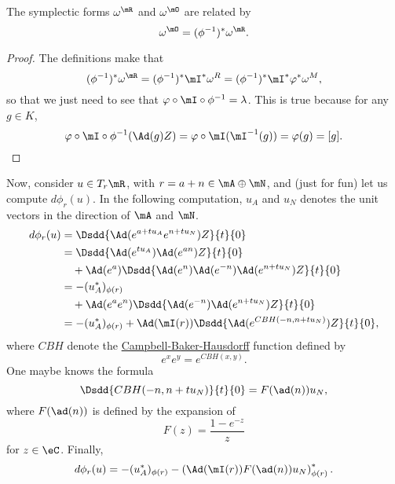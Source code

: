 \begin{lemma}\label{lem:om_O_om_R}
The symplectic forms $\omega^{\mR}$ and $\omega^{\mO}$ are related by
\begin{equation}
\omega^{\mO}=(\phi^{-1})^*\omega^{\mR}.
\end{equation}
\end{lemma}

\begin{proof}
The definitions make that
\begin{equation}
  (\phi^{-1})^*\omega^{\mR}=(\phi^{-1})^*\mI^*\omega^R
                          =(\phi^{-1})^*\mI^*\varphi^*\omega^M,
\end{equation}
so that we just need to see that $\varphi\circ\mI\circ\phi^{-1}=\lambda$. This is true because for any $g\in K$,
\[
   \varphi\circ\mI\circ\phi^{-1}(\Ad(g)Z)=\varphi\circ\mI(\mI^{-1}(g))=\varphi(g)=[g].
\]

\end{proof}

Now, consider $u\in T_r\mR$, with $r=a+n\in\mA\oplus\mN$, and (just for fun) let us compute $d\phi_r(u)$. In the following computation, $u_A$ and $u_N$ denotes the unit vectors in the direction of $\mA$ and $\mN$.
\begin{equation}
\begin{split}
   d\phi_r(u)&=\Dsdd{  \Ad(e^{a+tu_A}e^{n+tu_N})Z  }{t}{0}\\ 
             &=\Dsdd{ \Ad(e^{tu_A})\Ad(e^{an})Z  }{t}{0}\\
             &\quad+\Ad(e^a)\Dsdd{  \Ad(e^n)\Ad(e^{-n})\Ad(e^{n+tu_N})Z  }{t}{0}\\
	     &=-(u_A^*)_{\phi(r)}\\
	     &\quad+\Ad(e^ae^n)\Dsdd{ \Ad(e^{-n})\Ad( e^{n+tu_N} )Z  }{t}{0}\\
	     &=-(u_A^*)_{\phi(r)}+\Ad(\mI(r))\Dsdd{  \Ad(e^{ CBH(-n,n+tu_N) })Z  }{t}{0},
\end{split}
\end{equation}
where $CBH$ denote the \href{http://en.wikipedia.org/wiki/Baker-Campbell-Hausdorff_formula}{Campbell-Baker-Hausdorff} function defined by
\[
   e^xe^y=e^{CBH(x,y)}.
\]
One maybe knows the formula
\begin{equation}
\Dsdd{  CBH(-n,n+tu_N)  }{t}{0}=F(\ad(n))u_N,
\end{equation}
where $F(\ad(n))$ is defined by the expansion of 
\[
F(z)=\frac{1-e^{-z}}{z}
\]
for $z\in\eC$. Finally, 
\begin{equation}
d\phi_r(u)=-(u_A^*)_{\phi(r)}-\left(  \Ad(\mI(r))F(\ad(n))u_N  \right)^*_{\phi(r)}.
\end{equation}

